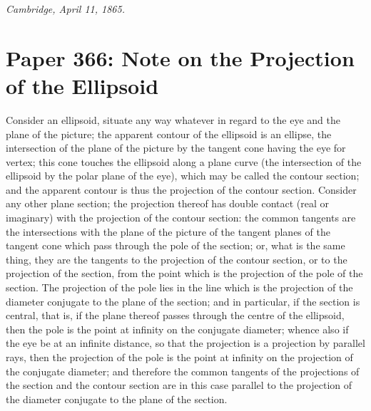 \documentclass[11pt]{article}
\begin{document}
\medskip
\noindent\textit{Cambridge, April 11, 1865.}

\bigskip

\section*{Paper 366: Note on the Projection of the Ellipsoid}

\medskip{}

\medskip
Consider an ellipsoid, situate any way whatever in regard to the eye and the plane of the picture; the apparent contour of the ellipsoid is an ellipse, the intersection of the plane of the picture by the tangent cone having the eye for vertex; this cone touches the ellipsoid along a plane curve (the intersection of the ellipsoid by the polar plane of the eye), which may be called the contour section; and the apparent contour is thus the projection of the contour section. Consider any other plane section; the projection thereof has double contact (real or imaginary) with the projection of the contour section: the common tangents are the intersections with the plane of the picture of the tangent planes of the tangent cone which pass through the pole of the section; or, what is the same thing, they are the tangents to the projection of the contour section, or to the projection of the section, from the point which is the projection of the pole of the section. The projection of the pole lies in the line which is the projection of the diameter conjugate to the plane of the section; and in particular, if the section is central, that is, if the plane thereof passes through the centre of the ellipsoid, then the pole is the point at infinity on the conjugate diameter; whence also if the eye be at an infinite distance, so that the projection is a projection by parallel rays, then the projection of the pole is the point at infinity on the projection of the conjugate diameter; and therefore the common tangents of the projections of the section and the contour section are in this case parallel to the projection of the diameter conjugate to the plane of the section.
\end{document}
